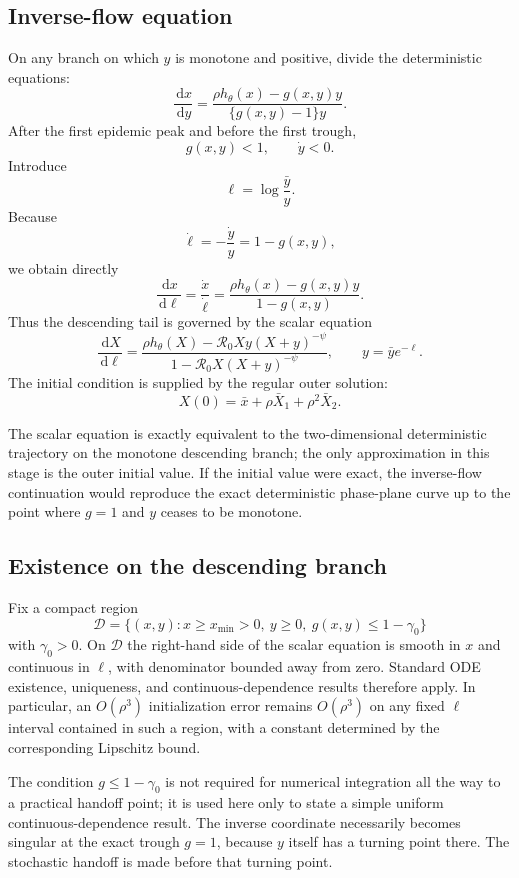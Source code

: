 \documentclass[11pt]{article}
\newcommand{\Rzero}{\mathcal R_0}
\newcommand{\hth}{h_\theta}
\newcommand{\dd}{\,\mathrm{d}}
\begin{document}
\subsection{Inverse-flow equation}
On any branch on which $y$ is monotone and positive, divide the deterministic equations:
\[
\frac{\dd x}{\dd y}
=
\frac{\rho\hth(x)-g(x,y)y}{\{g(x,y)-1\}y}.
\]
After the first epidemic peak and before the first trough,
\[
g(x,y)<1,
\qquad
\dot y<0.
\]
Introduce
\[
\ell=\log\frac{\bar y}{y}.
\]
Because
\[
\dot\ell=-\frac{\dot y}{y}=1-g(x,y),
\]
we obtain directly
\[
\frac{\dd x}{\dd\ell}
=\frac{\dot x}{\dot\ell}
=\frac{\rho\hth(x)-g(x,y)y}{1-g(x,y)}.
\]
Thus the descending tail is governed by the scalar equation
\[
\boxed{
\frac{\dd X}{\dd\ell}
=
\frac{\rho\hth(X)-\Rzero Xy(X+y)^{-\psi}}
{1-\Rzero X(X+y)^{-\psi}},
\qquad
 y=\bar y e^{-\ell}.
}
\]
The initial condition is supplied by the regular outer solution:
\[
\boxed{
X(0)=\bar x+\rho\bar X_1+\rho^2\bar X_2.
}
\]

The scalar equation is exactly equivalent to the two-dimensional deterministic trajectory on the monotone descending branch; the only approximation in this stage is the outer initial value. If the initial value were exact, the inverse-flow continuation would reproduce the exact deterministic phase-plane curve up to the point where $g=1$ and $y$ ceases to be monotone.

\subsection{Existence on the descending branch}
Fix a compact region
\[
\mathcal D
=\{(x,y):x\geq x_{\min}>0,\ y\geq0,\ g(x,y)\leq1-\gamma_0\}
\]
with $\gamma_0>0$. On $\mathcal D$ the right-hand side of the scalar equation is smooth in $x$ and continuous in $\ell$, with denominator bounded away from zero. Standard ODE existence, uniqueness, and continuous-dependence results therefore apply. In particular, an $O(\rho^3)$ initialization error remains $O(\rho^3)$ on any fixed $\ell$ interval contained in such a region, with a constant determined by the corresponding Lipschitz bound.

The condition $g\leq1-\gamma_0$ is not required for numerical integration all the way to a practical handoff point; it is used here only to state a simple uniform continuous-dependence result. The inverse coordinate necessarily becomes singular at the exact trough $g=1$, because $y$ itself has a turning point there. The stochastic handoff is made before that turning point.
\end{document}

